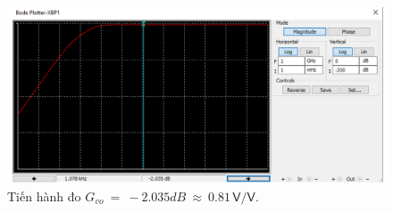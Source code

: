 \begin{figure}[H]
	\centering
	\includegraphics[width=\linewidth]{./my-chapters/my-images/Question3/b_gv.png}
	\caption{Tiến hành đo $G_{vo}\ =\ -2.035dB\ \approx\ 0.81\,\textsf{V/V}$.}
\end{figure}


